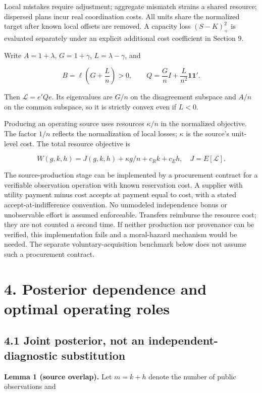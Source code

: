 \documentclass[
  11pt,
]{article}
\begin{document}
Local mistakes require adjustment; aggregate mismatch strains a shared
resource; dispersed plans incur real coordination costs. All units share
the normalized target after known local offsets are removed. A capacity
loss \((S-K)_+^2\) is evaluated separately under an explicit additional
cost coefficient in Section 9.

Write \(A=1+\lambda\), \(G=1+\gamma\), \(L=\lambda-\gamma\), and

\[B=\ell\left(G+\frac{L}{n}\right)>0,\qquad
Q=\frac Gn I+\frac L{n^2}\mathbf1\mathbf1'. \tag{3}\]

Then \(\mathcal L=e'Qe\). Its eigenvalues are \(G/n\) on the
disagreement subspace and \(A/n\) on the common subspace, so it is
strictly convex even if \(L<0\).

Producing an operating source uses resources \(\kappa/n\) in the
normalized objective. The factor \(1/n\) reflects the normalization of
local losses; \(\kappa\) is the source's unit-level cost. The total
resource objective is

\[W(g,k,h)=J(g,k,h)+\kappa g/n+c_R k+c_E h,\quad
J=E[\mathcal L]. \tag{4}\]

The source-production stage can be implemented by a procurement contract
for a verifiable observation operation with known reservation cost. A
supplier with utility payment minus cost accepts at payment equal to
cost, with a stated accept-at-indifference convention. No unmodeled
independence bonus or unobservable effort is assumed enforceable.
Transfers reimburse the resource cost; they are not counted a second
time. If neither production nor provenance can be verified, this
implementation fails and a moral-hazard mechanism would be needed. The
separate voluntary-acquisition benchmark below does not assume such a
procurement contract.

\section{4. Posterior dependence and optimal operating
roles}\label{posterior-dependence-and-optimal-operating-roles}

\subsection{4.1 Joint posterior, not an independent-diagnostic
substitution}\label{joint-posterior-not-an-independent-diagnostic-substitution}

\textbf{Lemma 1 (source overlap).} Let \(m=k+h\) denote the number of
public observations and
\end{document}
